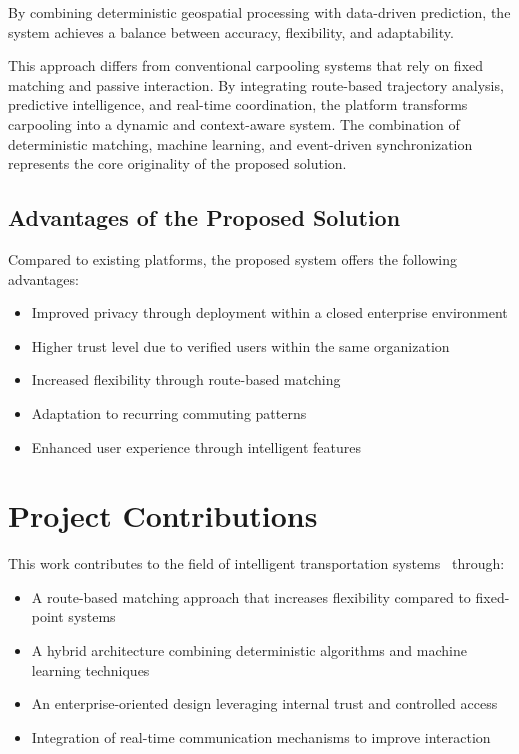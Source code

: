 By combining deterministic geospatial processing with data-driven prediction, the system achieves a balance between accuracy, flexibility, and adaptability.

This approach differs from conventional carpooling systems that rely on fixed matching and passive interaction. By integrating route-based trajectory analysis, predictive intelligence, and real-time coordination, the platform transforms carpooling into a dynamic and context-aware system. The combination of deterministic matching, machine learning, and event-driven synchronization represents the core originality of the proposed solution.

\subsection{Advantages of the Proposed Solution}

Compared to existing platforms, the proposed system offers the following advantages:

\begin{itemize}
    \item Improved privacy through deployment within a closed enterprise environment
    \item Higher trust level due to verified users within the same organization
    \item Increased flexibility through route-based matching
    \item Adaptation to recurring commuting patterns
    \item Enhanced user experience through intelligent features
\end{itemize}

\section{Project Contributions}

This work contributes to the field of intelligent transportation systems~\cite{its} through:

\begin{itemize}
    \item A route-based matching approach that increases flexibility compared to fixed-point systems
    \item A hybrid architecture combining deterministic algorithms and machine learning techniques
    \item An enterprise-oriented design leveraging internal trust and controlled access
    \item Integration of real-time communication mechanisms to improve interaction
\end{itemize}

